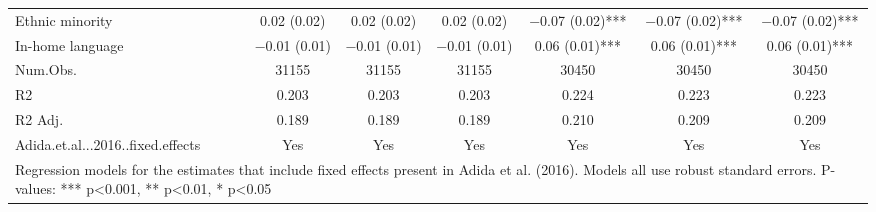 \begin{table}
\begin{tabular}[t]{lcccccc}
Ethnic minority & \num{0.02} (\num{0.02}) & \num{0.02} (\num{0.02}) & \num{0.02} (\num{0.02}) & \num{-0.07} (\num{0.02})*** & \num{-0.07} (\num{0.02})*** & \num{-0.07} (\num{0.02})***\\
In-home language & \num{-0.01} (\num{0.01}) & \num{-0.01} (\num{0.01}) & \num{-0.01} (\num{0.01}) & \num{0.06} (\num{0.01})*** & \num{0.06} (\num{0.01})*** & \num{0.06} (\num{0.01})***\\
\midrule
Num.Obs. & \num{31155} & \num{31155} & \num{31155} & \num{30450} & \num{30450} & \num{30450}\\
R2 & \num{0.203} & \num{0.203} & \num{0.203} & \num{0.224} & \num{0.223} & \num{0.223}\\
R2 Adj. & \num{0.189} & \num{0.189} & \num{0.189} & \num{0.210} & \num{0.209} & \num{0.209}\\
Adida.et.al...2016..fixed.effects & Yes & Yes & Yes & Yes & Yes & Yes\\
\bottomrule
\multicolumn{7}{l}{\rule{0pt}{1em}Regression models for the estimates that include fixed effects present in Adida et al. (2016). Models all use robust standard errors. P-values: *** p<0.001, ** p<0.01, * p<0.05}\\
\end{tabular}
\end{table}
